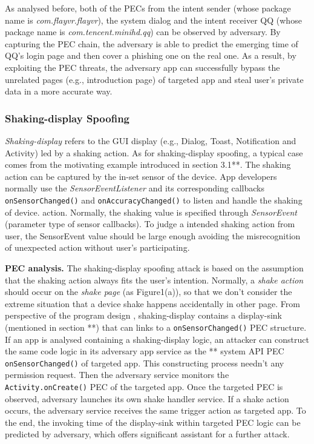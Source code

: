As analysed before, both of the PECs from the intent sender (whose package name is \textit{com.flayvr.flayvr}), the system dialog and the  intent receiver QQ (whose package name is \textit{com.tencent.minihd.qq}) can be observed by adversary. By capturing the PEC chain, the adversary is able to predict the emerging time of QQ's login page and then cover a phishing one on the real one. As a result, by exploiting the PEC threats, the adversary app can successfully bypass the unrelated pages (e.g., introduction page) of  targeted app and steal user's private data in a more accurate way.

\subsubsection{Shaking-display Spoofing}
\textit{Shaking-display} refers to the GUI display (e.g., Dialog, Toast, Notification and Activity) led by a shaking action. As for shaking-display spoofing, a typical case comes from the motivating example introduced in section 3.1**. The shaking action can be captured by the in-set sensor of the device. App developers normally use the \textit{SensorEventListener} and its corresponding callbacks \texttt{onSensorChanged()} and \texttt{onAccuracyChanged()} to listen and handle the shaking of device. action. Normally, the shaking value is specified through \textit{SensorEvent} (parameter type of sensor callbacks). To judge a intended shaking action from user, the SensorEvent value should be large enough avoiding the misrecognition of unexpected action without user's participating.

\textbf{PEC analysis.} The shaking-display spoofing attack is based on the assumption that the shaking action always fits the user's intention. Normally, a \textit{shake action} should occur on the \textit{shake page} (as Figure1(a)), so that we don't consider the extreme situation that a device shake happens accidentally in other page. From perspective of the program design , shaking-display contains a display-sink (mentioned in section **) that can links to a \texttt{onSensorChanged()} PEC structure. If an app is analysed containing a shaking-display logic,  an attacker can construct the same code logic in its adversary app service as the ** system API PEC \texttt{onSensorChanged()} of targeted app. This constructing process needn't any permission request. Then the adversary service monitors the \texttt{Activity.onCreate()} PEC of the targeted app. Once the targeted PEC is observed, adversary launches its own shake handler service. If a shake action occurs, the adversary service receives the same trigger action as targeted app. To the end, the invoking time of the display-sink within targeted PEC logic can be predicted by adversary, which offers significant assistant for a further attack. 

